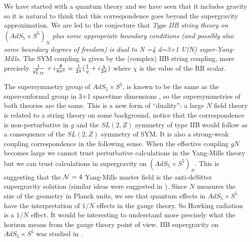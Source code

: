 We have  started with a quantum theory and we have seen that it includes
gravity so it is natural to think that this correspondence goes beyond
the supergravity approximation. 
We are led to the conjecture 
that
{\it Type IIB string theory on  $(AdS_5 \times S^5)_N$
 plus some appropriate
boundary conditions (and possibly also some boundary degrees of freedom)
 is
dual to {\cal N} =4 d=3+1 U(N) super-Yang-Mills.}
 The SYM coupling is given
by the (complex) IIB string coupling, more precisely $ { 1 \over g^2_{YM}} +
i {\theta \over 8 \pi^2}  = {1 \over  2\pi } ( { 1 \over g} 
+ i {\chi \over 2\pi})$ 
where $\chi$ is the value of the RR scalar.

The supersymmetry group of $AdS_5 \times S^5$, is known to be 
the same as the superconformal group in 3+1 spacetime dimensions 
,
so the supersymmetries of both theories are the same. 
This is a new form of ``duality'': a large $N$ field theory is related to a 
 string theory on some background, notice that the correspondence is
non-perturbative in $g$ and the $SL(2,Z)$ symmetry of type IIB would 
follow as a consequence of the $SL(2,Z)$ symmetry of SYM. 
It is also a strong-weak coupling correspondence in the following sense.
When the effective coupling $gN$ becomes large we cannot trust 
perturbative calculations in the Yang-Mills theory
 but we can trust calculations
in supergravity on $(AdS_5 \times S^5)_N$. 
This is suggesting that the ${\cal N} =4$
Yang-Mills master field is  the anti-deSitter
supergravity solution (similar ideas were suggested in \dps ).
Since $N$ measures the size of the geometry in Planck units, we see
that quantum effects in $AdS_5\times S^5$ have the interpretation of 
$1/N$ effects in the gauge theory. So Hawking radiation is a $1/N$
effect. It would be interesting to understand more precisely what 
the horizon means from the gauge theory point of view. 
IIB supergravity on $AdS_5\times S^5$ was studied in .


